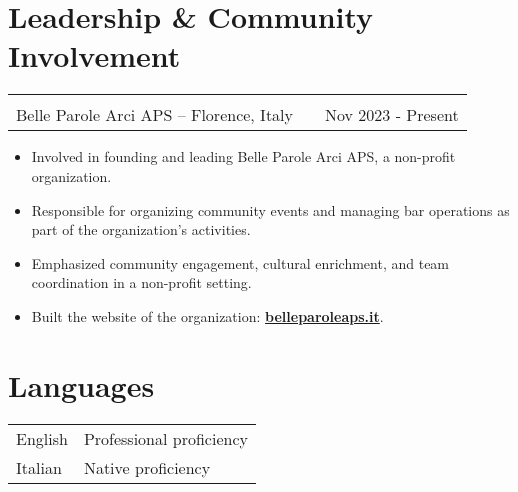 \documentclass[a4paper,12pt]{article}
\makeatletter
\newenvironment{joblong}[2]
    {
    \begin{tabularx}{\linewidth}{@{}l X r@{}}
    \textbf{#1} & \hfill &  #2 \\[3.75pt]
    \end{tabularx}
    \begin{minipage}[t]{\linewidth}
    \begin{itemize}[nosep,after=\strut, leftmargin=1em, itemsep=3pt,label=--]
    }
    {
    \end{itemize}
    \end{minipage}    
    }
\makeatother
\begin{document}
\section{Leadership \& Community Involvement}

\begin{joblong}{\shortstack[l]{Leadership in Non-Profit Organization,\\ Belle Parole Arci APS -- Florence, Italy}}{Nov 2023 - Present}
\item Involved in founding and leading Belle Parole Arci APS, a non-profit organization.
\item Responsible for organizing community events and managing bar operations as part of the organization's activities.
\item Emphasized community engagement, cultural enrichment, and team coordination in a non-profit setting.
\item Built the website of the organization: \href{http://belleparoleaps.it}{\textbf{belleparoleaps.it}}.
\end{joblong}

\section{Languages}
\begin{tabularx}{\linewidth}{@{}l X@{}}
English &  \normalsize{Professional proficiency}\\
Italian  &  \normalsize{Native proficiency}\\  
\end{tabularx}

\vfill
{}
\end{document}
